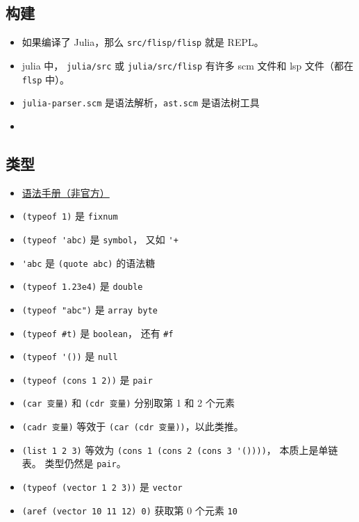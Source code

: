 
\subsection{构建}
\begin{itemize}
\item 如果编译了 Julia，那么 \verb`src/flisp/flisp` 就是 REPL。
\item julia 中， \verb`julia/src` 或 \verb`julia/src/flisp` 有许多 scm 文件和 lsp 文件（都在 \verb`flsp` 中）。
\item \verb`julia-parser.scm` 是语法解析，\verb`ast.scm` 是语法树工具
\item 
\end{itemize}


\subsection{类型}
\begin{itemize}
\item \href{https://code.google.com/archive/p/femtolisp/wikis/Manual.wiki}{语法手册（非官方）}
\item \verb`(typeof 1)` 是 \verb`fixnum`
\item \verb`(typeof 'abc)` 是 \verb`symbol`， 又如 \verb`'+`
\item \verb`'abc` 是 \verb`(quote abc)` 的语法糖
\item \verb`(typeof 1.23e4)` 是 \verb`double`
\item \verb`(typeof "abc")` 是 \verb`array byte`
\item \verb`(typeof #t)` 是 \verb`boolean`， 还有 \verb`#f`
\item \verb`(typeof '())` 是 \verb`null`
\item \verb`(typeof (cons 1 2))` 是 \verb`pair`
\item \verb`(car 变量)` 和 \verb`(cdr 变量)` 分别取第 1 和 2 个元素
\item \verb`(cadr 变量)` 等效于 \verb`(car (cdr 变量))`，以此类推。
\item \verb`(list 1 2 3)` 等效为 \verb`(cons 1 (cons 2 (cons 3 '())))`， 本质上是单链表。 类型仍然是 \verb`pair`。
\item \verb`(typeof (vector 1 2 3))` 是 \verb`vector`
\item \verb`(aref (vector 10 11 12) 0)` 获取第 0 个元素 \verb`10`
\end{itemize}

